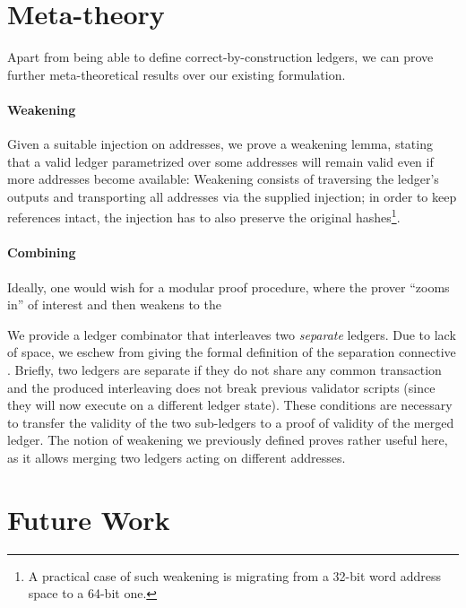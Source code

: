 \documentclass[sigplan,review,screen]{acmart}\settopmatter{printfolios=true,printccs=false,printacmref=false}
\begin{document}
\section{Meta-theory}
\label{sec:meta}
Apart from being able to define correct-by-construction ledgers, we can prove further meta-theoretical results over our
existing formulation.

\paragraph{Weakening}
Given a suitable injection on addresses, we prove a weakening lemma, stating that a valid ledger
parametrized over some addresses will remain valid even if more addresses become available:
\weakening{}
Weakening consists of traversing the ledger's outputs and transporting all addresses via the supplied injection;
in order to keep references intact, the injection has to also preserve the original hashes\footnote{
A practical case of such weakening is migrating from a 32-bit word address space to a 64-bit one.
}.

\paragraph{Combining}
Ideally, one would wish for a modular proof procedure, where the prover ``zooms in'' of interest
and then weakens to the 

We provide a ledger combinator that interleaves two \textit{separate} ledgers.
Due to lack of space, we eschew from giving the formal definition of the separation connective \inlineAst{}.
Briefly, two ledgers are separate if they do not share any common transaction and the produced interleaving 
does not break previous validator scripts (since they will now execute on a different ledger state).
These conditions are necessary to transfer the validity of the two sub-ledgers to a proof of validity of the merged ledger.
\combining{}
The notion of weakening we previously defined proves rather useful here,
as it allows merging two ledgers acting on different addresses.

\section{Future Work}
\label{sec:future}
\end{document}
